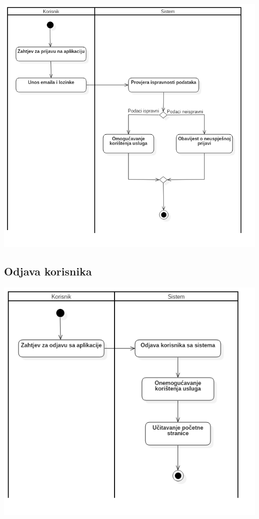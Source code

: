 \begin{center}
    \includegraphics[scale=0.7]{images/PrijavaKorisnika.png}
\end{center}

\subsection{Odjava korisnika}

\begin{center}
    \includegraphics[scale=0.8]{images/OdjavaKorisnika.png}
\end{center}

